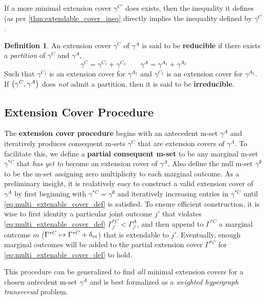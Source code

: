 \documentclass[aps, 10pt, english, twoside, pra, nofootinbib, longbibliography]{revtex4-1}
\theoremstyle{plain}
\theoremstyle{definition}
\newtheorem{definition}[theorem]{Definition}
\theoremstyle{remark}
\newcommand{\mset}[1]{\gamma^{#1}}
\newcommand{\extmset}[1]{\Gamma^{#1}}
\newcommand{\term}[1]{\textcolor{Mahogany}{\textbf{#1}}}
\begin{document}
    If a more minimal extension cover $\mset{C'}$ does exists, then the inequality it defines (as per \cref{thm:extendable_cover_ineq} directly implies the inequality defined by $\mset{C}$.

    \begin{definition}
        An extension cover $\mset{C}$ of $\mset{A}$ is said to be \term{reducible} if there exists a \textit{partition} of $\mset{C}$ and $\mset{A}$,
        \[ \mset{C} = \mset{C_1} + \mset{C_2} \qquad \mset{A} = \mset{A_1} + \mset{A_2} \]
        Such that $\mset{C_1}$ is an extension cover for $\mset{A_1}$ and $\mset{C_2}$ is an extension cover for $\mset{A_2}$. If $\br{\mset{C}, \mset{A}}$ does \textit{not} admit a partition, then it is said to be \term{irreducible}.
    \end{definition}


    \subsection{Extension Cover Procedure}
    The \term{extension cover procedure} begins with an antecedent m-set $\mset{A}$ and iteratively produces consequent m-sets $\mset{C}$ that are extension covers of $\mset{A}$. To facilitate this, we define a \term{partial consequent m-set} to be any marginal m-set $\mset{*C}$ that \textit{has yet to} become an extension cover of $\mset{A}$. Also define the null m-set $\mset{\emptyset}$ to be the m-set assigning zero multiplicity to each marginal outcome. As a preliminary insight, it is realatively easy to construct a valid extension cover of $\mset{A}$ by first beginning with $\mset{*C} = \mset{\emptyset}$ and iteratively increasing entries in $\mset{*C}$ until \cref{eq:multi_extenable_cover_def} is satisfied. To ensure efficient construction, it is wise to first identity a particular joint outcome $j'$ that violates \cref{eq:multi_extenable_cover_def} $\extmset{*C}_{j'} < \extmset{A}_{j'}$, and then append to $\extmset{*C}$ a marginal outcome $m$ ($\extmset{*C} \mapsto \extmset{*C} + \de_{m}$) that is extendable to $j'$. Eventually, enough marginal outcomes will be added to the partial extension cover $\extmset{*C}$ for \cref{eq:multi_extenable_cover_def} to hold.

    This procedure can be generalized to find \textit{all} minimal extension covers for a chosen antecdent m-set $\mset{A}$ and is best formalized as a \textit{weighted hypergraph transversal} problem.
\end{document}
